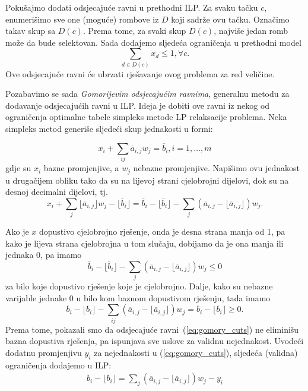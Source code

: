 \documentclass[a4paper, utf8, 11pt, colorlinks]{book}
\begin{document}
Pokušajmo dodati odsjecajuće ravni u prethodni ILP. Za svaku tačku $c$, enumerišimo sve one (moguće) rombove iz $D$ koji sadrže ovu tačku. Označimo takav skup sa $D(c)$. Prema tome, za svaki skup $D(c)$, najviše jedan romb može da bude selektovan. Sada dodajemo sljedeća ograničenja u prethodni model
\begin{equation}
     \sum_{d \in D(c)} x_d \leq 1, \forall c.
\end{equation}
Ove odsjecajuće ravni će ubrzati rješavanje ovog problema za   red veličine.

Pozabavimo se sada \emph{Gomorijevim odsjecajućim ravnima}, generalnu metodu za dodavanje odsjecajućih ravni u ILP.  Ideja je dobiti ove ravni iz nekog od ograničenja optimalne tabele simpleks metode LP relaksacije problema. Neka simpleks metod generiše sljedeći skup jednakosti u formi:

$$x_i + \sum_{ij} \overline{a}_{i,j} w_j= \overline{b}_i, i=1, \ldots,m$$
gdje su $x_i$ bazne promjenjive, a $w_j$ nebazne promjenjive. Napišimo ovu jednakost u drugačijem obliku tako da su na lijevoj strani cjelobrojni dijelovi, dok su na desnoj decimalni dijelovi, tj.
$$x_i + \sum_{j} \lfloor \overline{a}_{i,j} \rfloor w_j - \lfloor \overline{b}_i \rfloor = \overline{b}_i - \lfloor \overline{b}_i  \rfloor    - \sum_{j} (\overline{a}_{i,j} - \lfloor \overline{a}_{i,j} \rfloor) w_j.$$

Ako je $x$ dopustivo cjelobrojno rješenje, onda je desna strana manja od 1, pa kako je lijeva strana cjelobrojna u tom slučaju, dobijamo da je ona manja ili jednaka 0, pa imamo
\begin{equation}\label{eq:gomory_cuts}
    \overline{b}_i - \lfloor \overline{b}_i  \rfloor    - \sum_{j} (\overline{a}_{i,j} - \lfloor \overline{a}_{i,j} \rfloor) w_j \leq 0
\end{equation}
za bilo koje dopustivo rješenje koje je cjelobrojno. Dalje, kako su nebazne varijable jednake 0 u bilo kom baznom dopustivom rješenju, tada imamo 
$$ \overline{b}_i - \lfloor \overline{b}_i  \rfloor    - \sum_{ij} (\overline{a}_{i,j} - \lfloor \overline{a}_{i,j} \rfloor) w_j = \overline{b}_i - \lfloor \overline{b}_i \rfloor  \geq 0.$$
Prema tome, pokazali smo da odsjecajuće ravni~(\ref{eq:gomory_cuts}) ne eliminišu bazna dopustiva rješenja, pa ispunjava sve uslove za validnu nejednakost. Uvodeći dodatnu promjenjivu $y_i$ za nejednakosti u (\ref{eq:gomory_cuts}), sljedeća (validna) ograničenja dodajemo u ILP:
\begin{align}\label{gomory_cplex}
       \overline{b}_i - \lfloor \overline{b}_i \rfloor=   \sum_{j} (\overline{a}_{i,j} - \lfloor \overline{a}_{i,j} \rfloor) w_j - y_i 
\end{align}
\end{document}
